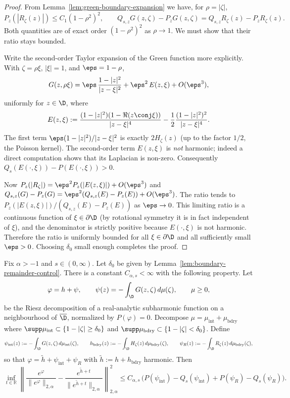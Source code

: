 \begin{proof}
From Lemma~\ref{lem:green-boundary-expansion} we have, for $\rho=|\zeta|$,
\[
P_z(|R_\zeta(z)|)\le C_1(1-\rho^2)^2,
\qquad
Q_{s,z}G(z,\zeta)-P_zG(z,\zeta)
=Q_{s,z}R_\zeta(z)-P_zR_\zeta(z).
\]
Both quantities are of exact order $(1-\rho^2)^2$ as $\rho\to1$.
We must show that their ratio stays bounded.

Write the second-order Taylor expansion of the Green function more
explicitly.  With $\zeta=\rho\xi$, $|\xi|=1$, and $\eps=1-\rho$,
\[
G(z,\rho\xi)
=
\eps\,\frac{1-|z|^2}{|z-\xi|^2}
+
\eps^2\,E(z,\xi)+O(\eps^3),
\]
uniformly for $z\in\D$, where
\[
E(z,\xi)
:=
\frac{(1-|z|^2)(1-\Re(z\conj\xi))}{|z-\xi|^4}
-\frac12\frac{(1-|z|^2)^2}{|z-\xi|^4}.
\]
The first term $\eps(1-|z|^2)/|z-\xi|^2$ is exactly $2H_\zeta(z)$
(up to the factor $1/2$, the Poisson kernel).  The second-order term
$E(z,\xi)$ is \emph{not} harmonic; indeed a direct computation shows that
its Laplacian is non-zero.  Consequently
$Q_s(E(\cdot,\xi))-P(E(\cdot,\xi))>0$.

Now $P_z(|R_\zeta|)=\eps^2 P_z(|E(z,\xi)|)+O(\eps^3)$ and
$Q_{s,z}(G)-P_z(G)=\eps^2(Q_{s,z}(E)-P_z(E))+O(\eps^3)$.
The ratio tends to
$P_z(|E(z,\xi)|)/(Q_{s,z}(E)-P_z(E))$ as $\eps\to0$.
This limiting ratio is a continuous function of $\xi\in\partial\D$ (by
rotational symmetry it is in fact independent of $\xi$), and the denominator
is strictly positive because $E(\cdot,\xi)$ is not harmonic.  Therefore the
ratio is uniformly bounded for all $\xi\in\partial\D$ and all sufficiently
small $\eps>0$.  Choosing $\delta_0$ small enough completes the proof.
\end{proof}


\begin{numprop}\label{prop:nonlinear-green-absorption}
Fix $\alpha>-1$ and $s\in(0,\infty)$.  Let $\delta_0$ be given by
Lemma~\ref{lem:boundary-remainder-control}.  There is a constant
$C_{\alpha,s}<\infty$ with the following property.  Let
\[
\varphi=h+\psi,\qquad
\psi(z)=-\int_\D G(z,\zeta)\,d\mu(\zeta),\qquad \mu\ge0,
\]
be the Riesz decomposition of a real-analytic subharmonic function on a
neighbourhood of $\overline\D$, normalized by $P(\varphi)=0$.
Decompose $\mu=\mu_{\mathrm{int}}+\mu_{\mathrm{bdry}}$ where
$\supp\mu_{\mathrm{int}}\subset\{1-|\zeta|\ge\delta_0\}$ and
$\supp\mu_{\mathrm{bdry}}\subset\{1-|\zeta|<\delta_0\}$.
Define
\[
\psi_{\mathrm{int}}(z):=-\int_\D G(z,\zeta)\,d\mu_{\mathrm{int}}(\zeta),
\qquad
h_{\mathrm{bdry}}(z):=-\int_\D H_\zeta(z)\,d\mu_{\mathrm{bdry}}(\zeta),
\qquad
\psi_{R}(z):=-\int_\D R_\zeta(z)\,d\mu_{\mathrm{bdry}}(\zeta),
\]
so that $\varphi=\widetilde h+\psi_{\mathrm{int}}+\psi_{R}$ with
$\widetilde h:=h+h_{\mathrm{bdry}}$ harmonic.  Then
\[
\inf_{t\in\mathbb R}
\left\|
\frac{e^\varphi}{\|e^\varphi\|_{2,\alpha}}
-
\frac{e^{\widetilde h+t}}{\|e^{\widetilde h+t}\|_{2,\alpha}}
\right\|_{2,\alpha}^2
\le
C_{\alpha,s}\,
\bigl(P(\psi_{\mathrm{int}})-Q_s(\psi_{\mathrm{int}})
+P(\psi_{R})-Q_s(\psi_{R})\bigr).
\]
\end{numprop}

